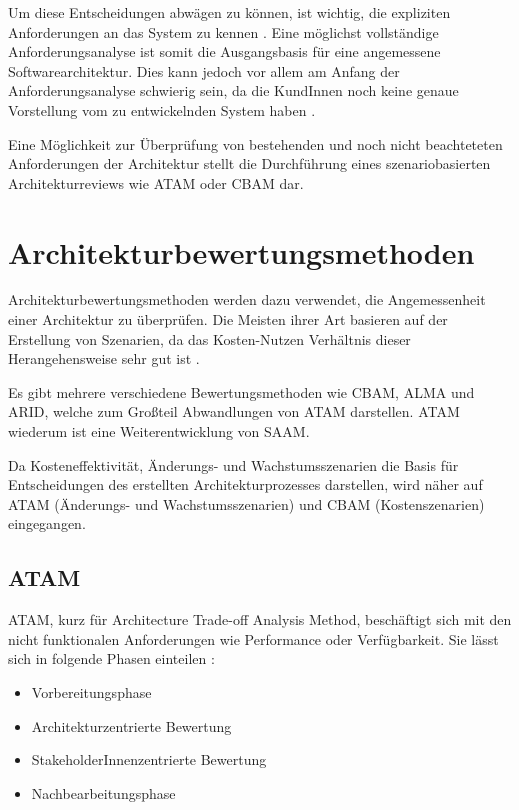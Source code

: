 Um diese Entscheidungen abwägen zu können, ist wichtig, die expliziten Anforderungen an das System zu kennen \cite[S. 19]{review}. Eine möglichst vollständige Anforderungsanalyse ist somit die Ausgangsbasis für eine angemessene Softwarearchitektur. Dies kann jedoch vor allem am Anfang der Anforderungsanalyse schwierig sein, da die KundInnen noch keine genaue Vorstellung vom zu entwickelnden System haben \cite[S. 80]{reqman}.

Eine Möglichkeit zur Überprüfung von bestehenden und noch nicht beachteteten Anforderungen der Architektur stellt die Durchführung eines szenariobasierten Architekturreviews wie ATAM oder CBAM dar.


\section{Architekturbewertungsmethoden}
Architekturbewertungsmethoden werden dazu verwendet, die Angemessenheit einer Architektur zu überprüfen. Die Meisten ihrer Art basieren auf der Erstellung von Szenarien, da das Kosten-Nutzen Verhältnis dieser Herangehensweise sehr gut ist \cite[S. 185]{basiswissen}.

Es gibt mehrere verschiedene Bewertungsmethoden wie CBAM, ALMA und ARID, welche zum Großteil Abwandlungen von ATAM darstellen. ATAM wiederum ist eine Weiterentwicklung von SAAM. \cite[S. 60-76]{review}

Da Kosteneffektivität, Änderungs- und Wachstumsszenarien die Basis für Entscheidungen des erstellten Architekturprozesses darstellen, wird näher auf ATAM (Änderungs- und Wachstumsszenarien) und CBAM (Kostenszenarien) eingegangen.

\subsection{ATAM}
ATAM, kurz für Architecture Trade-off Analysis Method, beschäftigt sich mit den nicht funktionalen Anforderungen wie Performance oder Verfügbarkeit. Sie lässt sich in folgende Phasen einteilen \cite[S. 185]{basiswissen}:

\begin{itemize}
  \item Vorbereitungsphase
  \item Architekturzentrierte Bewertung
  \item StakeholderInnenzentrierte Bewertung
  \item Nachbearbeitungsphase
\end{itemize}

